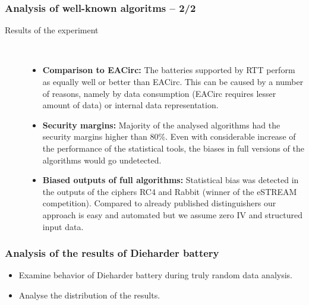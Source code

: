 \documentclass[aspectratio=169]{beamer}
\begin{document}
\begin{frame}
\frametitle{Analysis of well-known algoritms -- 2/2}

\begin{description}
\item[Results of the experiment] \hfill \\
\begin{itemize}
\item \textbf{Comparison to EACirc:} The batteries supported by RTT perform as equally well or better than EACirc. This can be caused by a number of reasons, namely by data consumption (EACirc requires lesser amount of data) or internal data representation.
\item \textbf{Security margins:} Majority of the analysed algorithms had the security margins higher than 80\%. Even with considerable increase of the performance of the statistical tools, the biases in full versions of the algorithms would go undetected.
\item \textbf{Biased outputs of full algorithms:} Statistical bias was detected in the outputs of the ciphers RC4 and Rabbit (winner of the eSTREAM competition). Compared to already published distinguishers our approach is easy and automated but we assume zero IV and structured input data.
\end{itemize}
\end{description}

\end{frame}

\begin{frame}
\frametitle{Analysis of the results of Dieharder battery}
\begin{itemize}
\item Examine behavior of Dieharder battery during truly random data analysis.
\item Analyse the distribution of the results.
\end{itemize}
\end{frame}

\end{document}
